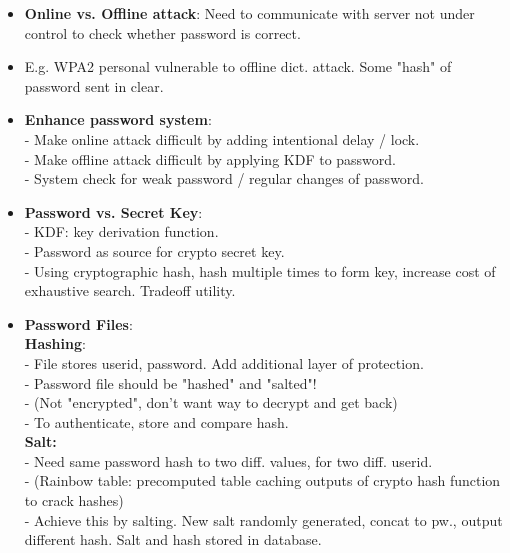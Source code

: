 \documentclass[10pt, landscape]{article}
\begin{document}
\begin{multicols*}{3}
\begin{itemize}
\item \textbf{Online vs. Offline attack}: Need to communicate with server not under control to check whether password is correct.
\item E.g. WPA2 personal vulnerable to offline dict. attack. Some "hash" of password sent in clear.
\item \textbf{Enhance password system}: \\
- Make online attack difficult by adding intentional delay / lock. \\
- Make offline attack difficult by applying KDF to password. \\
- System check for weak password / regular changes of password.
\item \textbf{Password vs. Secret Key}: \\
- KDF: key derivation function. \\
- Password as source for crypto secret key. \\
- Using cryptographic hash, hash multiple times to form key, increase cost of exhaustive search. Tradeoff utility.
\end{itemize}

\columnbreak
\begin{itemize}
\item \textbf{Password Files}: \\
\textbf{Hashing}: \\
- File stores userid, password. Add additional layer of protection. \\
- Password file should be "hashed" and "salted"! \\
- (Not "encrypted", don't want way to decrypt and get back) \\
- To authenticate, store and compare hash. \\
\textbf{Salt:} \\
- Need same password hash to two diff. values, for two diff. userid. \\
- (Rainbow table: precomputed table caching outputs of crypto hash function to crack hashes) \\
- Achieve this by salting. New salt randomly generated, concat to pw., output different hash. Salt and hash stored in database.
\end{itemize}


\end{multicols*}
\end{document}
